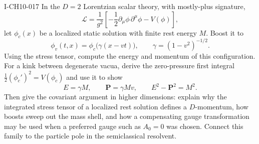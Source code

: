 \begin{exercise}{I-CH10-017}
In the $D=2$ Lorentzian scalar theory, with mostly-plus signature,
\[
  \mathcal L=\frac1{g^2}\left[
    -\frac12\partial_\mu\phi\,\partial^\mu\phi-V(\phi)\right],
\]
let $\phi_c(x)$ be a localized static solution with finite rest energy $M$.
Boost it to
\[
  \phi_v(t,x)=\phi_c\bigl(\gamma(x-vt)\bigr),
  \qquad \gamma=(1-v^2)^{-1/2}.
\]
Using the stress tensor, compute the energy and momentum of this configuration.
For a kink between degenerate vacua, derive the zero-pressure first integral
$\tfrac12(\phi_c')^2=V(\phi_c)$ and use it to show
\[
  E=\gamma M,\qquad \mathbf P=\gamma Mv,\qquad
  E^2-\mathbf P^2=M^2.
\]
Then give the covariant argument in higher dimensions: explain why the
integrated stress tensor of a localized rest solution defines a $D$-momentum,
how boosts sweep out the mass shell, and how a compensating gauge
transformation may be used when a preferred gauge such as $A_0=0$ was chosen.
Connect this family to the particle pole in the semiclassical resolvent.
\end{exercise}

